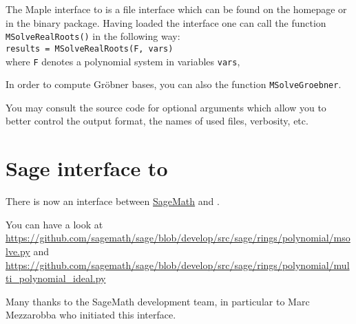\documentclass[a4paper,english,11pt]{scrartcl}
\theoremstyle{definition}
\theoremstyle{remark}
\begin{document}
The Maple interface to \msolve is a file interface which can be found on the
\msolve homepage or in the \msolve binary package. Having loaded the interface
one can call the function
\texttt{MSolveRealRoots()} in the following way:\\[1em]
\texttt{results = MSolveRealRoots(F, vars)}\\[1em]
where \texttt{F} denotes a polynomial system in variables \texttt{vars},


In order to compute Gr\"obner bases, you can also the function
\texttt{MSolveGroebner}. 

You may consult the source code for optional arguments which allow you to better
control the output format, the names of used files, verbosity, etc.

\section{Sage interface to \msolve}

There is now an interface between \href{https://www.sagemath.org/}{SageMath} 
and \msolve. 

You can have a look at 
\url{https://github.com/sagemath/sage/blob/develop/src/sage/rings/polynomial/msolve.py}
and 
\url{https://github.com/sagemath/sage/blob/develop/src/sage/rings/polynomial/multi_polynomial_ideal.py}

\hfill Many thanks to the SageMath development team, in particular to Marc 
Mezzarobba who initiated this interface.

\end{document}
